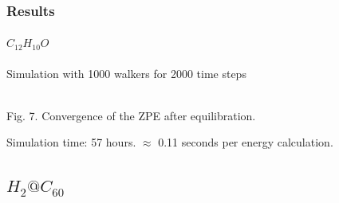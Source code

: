 \documentclass{beamer}
\begin{document}
\begin{frame}
\frametitle{Results}
\framesubtitle{$C_{12} H_{10} O$}
Simulation with 1000 walkers for 2000 time steps
\begin{center}
\\
Fig. 7. Convergence of the ZPE after equilibration.
\end{center}
Simulation time: 57 hours. $\approx$ 0.11 seconds per energy calculation.


\end{frame}

\subsection{$H_2@C_{60}$}
\end{document}
